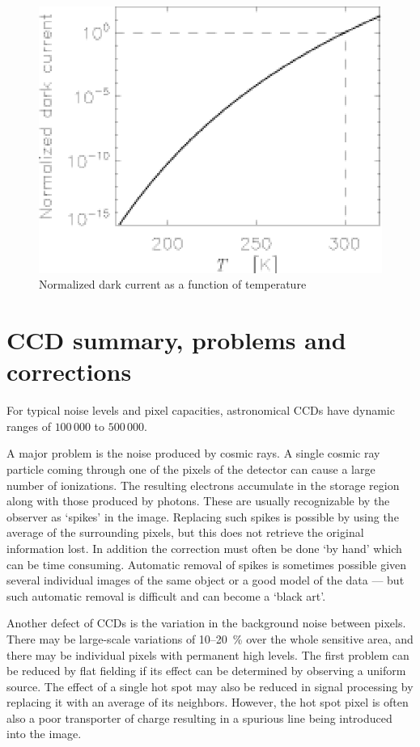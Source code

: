 \begin{figure}[h]
  \centering
	\includegraphics{CCD_dark.eps}
  \caption{Normalized dark current as a function of temperature }
  \label{CCD.figdark}
\end{figure}

\section{CCD summary, problems and corrections}

For typical noise levels and pixel capacities, astronomical CCDs have dynamic
ranges of $100\,000$ to $500\,000$.

A major problem is the noise produced by cosmic rays. A single cosmic ray
particle coming through one of the pixels of the detector can cause a large
number of ionizations. The resulting electrons accumulate in the storage 
region along with those produced by photons. These are usually recognizable
by the observer as `spikes' in the image. Replacing such spikes is possible
by using the average of the surrounding pixels, but this does not retrieve 
the original information lost. In addition the correction must often be done
`by hand' which can be time consuming. Automatic removal of spikes is 
sometimes possible given several individual images of the same object or a 
good model of the data --- but such automatic removal is difficult and 
can become a `black art'. 

Another defect of CCDs is the variation in the background noise between 
pixels. There may be large-scale variations of 10--20~\% over the whole
sensitive area, and there may be individual pixels with permanent high levels.
The first problem can be reduced by flat fielding if its effect can be 
determined by observing a uniform source. The effect of a single hot spot
may also be reduced in signal processing by replacing it with an average of
its neighbors. However, the hot spot pixel is often also a poor transporter 
of charge resulting in a spurious line being introduced into the image.

